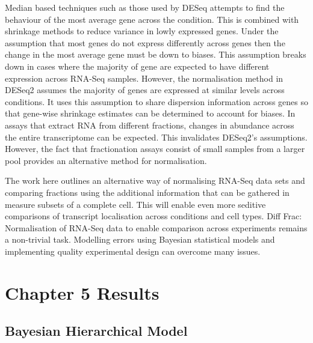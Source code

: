 \documentclass[../main.tex]{subfiles}
\begin{document}
Median based techniques such as those used by DESeq attempts to find the behaviour of the most average gene across the condition.
This is combined with shrinkage methods to reduce variance in lowly expressed genes.
Under the assumption that most genes do not express differently across genes then the change in the most average gene must be down to biases.
This assumption breaks down in cases where the majority of gene are expected to have different expression across RNA-Seq samples. 
However, the normalisation method in DESeq2 assumes the majority of genes are expressed at similar levels across conditions. 
It uses this assumption to share dispersion information across genes so that gene-wise shrinkage estimates can be determined to account for biases. 
In assays that extract RNA from different fractions, changes in abundance across the entire transcriptome can be expected. 
This invalidates DESeq2’s assumptions.
However, the fact that fractionation assays consist of small samples from a larger pool provides an alternative method for normalisation.


The work here outlines an alternative way of normalising RNA-Seq data sets and comparing fractions using the additional information that can be gathered in measure subsets of a complete cell.
This will enable even more seditive comparisons of transcript localisation across conditions and cell types.
Diff Frac: Normalisation of RNA-Seq data to enable comparison across experiments remains a non-trivial task. 
Modelling errors using Bayesian statistical models and implementing quality experimental design can overcome many issues.



\section{Chapter 5 Results}

\subsection{Bayesian Hierarchical Model}
\end{document}
